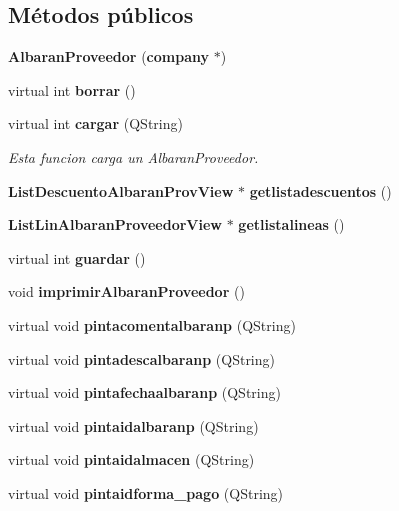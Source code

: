 \subsection*{M\'{e}todos p\'{u}blicos}
\begin{CompactItemize}
\item 
{\bf Albaran\-Proveedor} ({\bf company} $\ast$)\label{classAlbaranProveedor_a0}

\item 
virtual int {\bf borrar} ()\label{classAlbaranProveedor_a1}

\item 
virtual int {\bf cargar} (QString)\label{classAlbaranProveedor_a2}

\begin{CompactList}\small\item\em Esta funcion carga un Albaran\-Proveedor. \item\end{CompactList}\item 
{\bf List\-Descuento\-Albaran\-Prov\-View} $\ast$ {\bf getlistadescuentos} ()\label{classAlbaranProveedor_a3}

\item 
{\bf List\-Lin\-Albaran\-Proveedor\-View} $\ast$ {\bf getlistalineas} ()\label{classAlbaranProveedor_a4}

\item 
virtual int {\bf guardar} ()\label{classAlbaranProveedor_a5}

\item 
void {\bf imprimir\-Albaran\-Proveedor} ()
\item 
virtual void {\bf pintacomentalbaranp} (QString)\label{classAlbaranProveedor_a7}

\item 
virtual void {\bf pintadescalbaranp} (QString)\label{classAlbaranProveedor_a8}

\item 
virtual void {\bf pintafechaalbaranp} (QString)\label{classAlbaranProveedor_a9}

\item 
virtual void {\bf pintaidalbaranp} (QString)\label{classAlbaranProveedor_a10}

\item 
virtual void {\bf pintaidalmacen} (QString)\label{classAlbaranProveedor_a11}

\item 
virtual void {\bf pintaidforma\_\-pago} (QString)\label{classAlbaranProveedor_a12}


\end{CompactItemize}
